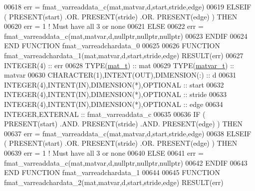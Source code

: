 \begin{DoxyCode}
00618         err = fmat\_varreaddata\_c(mat,matvar,d,start,stride,edge)
00619     \textcolor{keywordflow}{ELSEIF} ( \textcolor{keyword}{PRESENT}(start) .OR. \textcolor{keyword}{PRESENT}(stride) .OR. \textcolor{keyword}{PRESENT}(edge) ) \textcolor{keywordflow}{THEN}
00620         err = 1    \textcolor{comment}{! Must have all 3 or none}
00621     \textcolor{keywordflow}{ELSE}
00622         err = fmat\_varreaddata\_c(mat,matvar,d,nullptr,nullptr,nullptr)
00623 \textcolor{keywordflow}{    ENDIF}
00624 \textcolor{keyword}{END FUNCTION }fmat\_varreadchardata\_0
00625 
00626 \textcolor{keyword}{FUNCTION }fmat\_varreadchardata\_1(mat,matvar,d,start,stride,edge) \textcolor{keyword}{RESULT}(err)
00627     \textcolor{keywordtype}{INTEGER(4)}                                  :: err
00628     \textcolor{keywordtype}{TYPE}(\hyperlink{group___m_a_t_gab0fc888f5a5d79943b16284b1f91c2e8}{mat\_t})                                 :: mat
00629     \textcolor{keywordtype}{TYPE}(\hyperlink{group___m_a_t_structmatvar__t}{matvar\_t})                              :: matvar
00630     \textcolor{keywordtype}{CHARACTER(1)},\textcolor{keywordtype}{INTENT(OUT)},\textcolor{keywordtype}{DIMENSION(:)}       :: d
00631     \textcolor{keywordtype}{INTEGER(4)},\textcolor{keywordtype}{INTENT(IN)},\textcolor{keywordtype}{DIMENSION(*)},\textcolor{keywordtype}{OPTIONAL} :: start
00632     \textcolor{keywordtype}{INTEGER(4)},\textcolor{keywordtype}{INTENT(IN)},\textcolor{keywordtype}{DIMENSION(*)},\textcolor{keywordtype}{OPTIONAL} :: stride
00633     \textcolor{keywordtype}{INTEGER(4)},\textcolor{keywordtype}{INTENT(IN)},\textcolor{keywordtype}{DIMENSION(*)},\textcolor{keywordtype}{OPTIONAL} :: edge
00634     \textcolor{keywordtype}{INTEGER},\textcolor{keywordtype}{EXTERNAL}                            :: fmat\_varreaddata\_c
00635 
00636     \textcolor{keywordflow}{IF} ( \textcolor{keyword}{PRESENT}(start) .AND. \textcolor{keyword}{PRESENT}(stride) .AND. \textcolor{keyword}{PRESENT}(edge) ) \textcolor{keywordflow}{THEN}
00637         err = fmat\_varreaddata\_c(mat,matvar,d,start,stride,edge)
00638     \textcolor{keywordflow}{ELSEIF} ( \textcolor{keyword}{PRESENT}(start) .OR. \textcolor{keyword}{PRESENT}(stride) .OR. \textcolor{keyword}{PRESENT}(edge) ) \textcolor{keywordflow}{THEN}
00639         err = 1    \textcolor{comment}{! Must have all 3 or none}
00640     \textcolor{keywordflow}{ELSE}
00641         err = fmat\_varreaddata\_c(mat,matvar,d,nullptr,nullptr,nullptr)
00642 \textcolor{keywordflow}{    ENDIF}
00643 \textcolor{keyword}{END FUNCTION }fmat\_varreadchardata\_1
00644 
00645 \textcolor{keyword}{FUNCTION }fmat\_varreadchardata\_2(mat,matvar,d,start,stride,edge) \textcolor{keyword}{RESULT}(err)

\end{DoxyCode}
